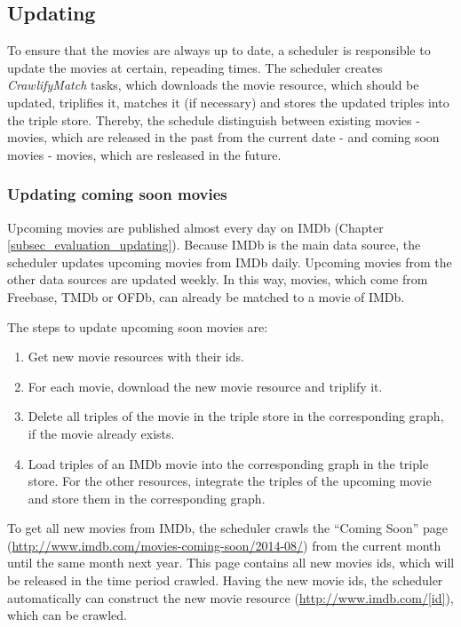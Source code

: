 \subsection{Updating}
\label{subsec_method_updating}

To ensure that the movies are always up to date, a scheduler is responsible to update the movies at certain, repeading times.
The scheduler creates \textit{CrawlifyMatch} tasks, which downloads the movie resource, which should be updated, triplifies it, matches it (if necessary) and stores the updated triples into the triple store.
Thereby, the schedule distinguish between existing movies - movies, which are released in the past from the current date - and coming soon movies - movies, which are resleased in the future.

\subsubsection{Updating coming soon movies}
Upcoming movies are published almost every day on IMDb (Chapter \ref{subsec_evaluation_updating}).
Because IMDb is the main data source, the scheduler updates upcoming movies from IMDb daily.
Upcoming movies from the other data sources are updated weekly.
In this way, movies, which come from Freebase, TMDb or OFDb, can already be matched to a movie of IMDb.

The steps to update upcoming soon movies are:
\begin {enumerate}
	\item Get new movie resources with their ids.
	\item For each movie, download the new movie resource and triplify it.
	\item Delete all triples of the movie in the triple store in the corresponding graph, if the movie already exists.
	\item Load triples of an IMDb movie into the corresponding graph in the triple store. For the other resources, integrate the triples of the upcoming movie and store them in the corresponding graph.
\end{enumerate}

To get all new movies from IMDb, the scheduler crawls the "`Coming Soon"' page (\url{http://www.imdb.com/movies-coming-soon/2014-08/}) from the current month until the same month next year.
This page contains all new movies ids, which will be released in the time period crawled.
Having the new movie ids, the scheduler automatically can construct the new movie resource (\url{http://www.imdb.com/[id]}), which can be crawled.

